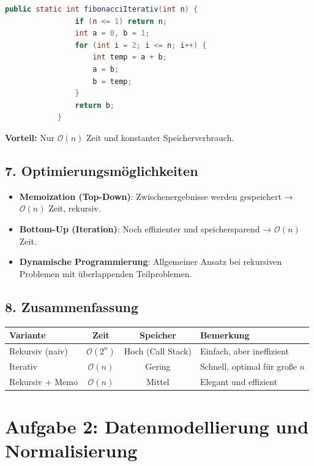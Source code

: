 \documentclass[a4paper,12pt]{article}
\begin{document}
		\begin{lstlisting}[language=Java, caption=Iterative Berechnung]
			public static int fibonacciIterativ(int n) {
				if (n <= 1) return n;
				int a = 0, b = 1;
				for (int i = 2; i <= n; i++) {
					int temp = a + b;
					a = b;
					b = temp;
				}
				return b;
			}
		\end{lstlisting}
		
		\textbf{Vorteil:} Nur \(\mathcal{O}(n)\) Zeit und konstanter Speicherverbrauch.
		
		\subsection*{7. Optimierungsmöglichkeiten}
		
		\begin{itemize}
			\item \textbf{Memoization (Top-Down)}: Zwischenergebnisse werden gespeichert → \(\mathcal{O}(n)\) Zeit, rekursiv.
			\item \textbf{Bottom-Up (Iteration)}: Noch effizienter und speichersparend → \(\mathcal{O}(n)\) Zeit.
			\item \textbf{Dynamische Programmierung}: Allgemeiner Ansatz bei rekursiven Problemen mit überlappenden Teilproblemen.
		\end{itemize}
		
		\subsection*{8. Zusammenfassung}
		
		\begin{center}
			\begin{tabular}{|l|c|c|p{5cm}|}
				\hline
				\textbf{Variante} & \textbf{Zeit} & \textbf{Speicher} & \textbf{Bemerkung} \\
				\hline
				Rekursiv (naiv) & $\mathcal{O}(2^n)$ & Hoch (Call Stack) & Einfach, aber ineffizient \\
				\hline
				Iterativ & $\mathcal{O}(n)$ & Gering & Schnell, optimal für große $n$ \\
				\hline
				Rekursiv + Memo & $\mathcal{O}(n)$ & Mittel & Elegant und effizient \\
				\hline
			\end{tabular}
		\end{center}
		
		\section*{Aufgabe 2: Datenmodellierung und Normalisierung}
		
\end{document}
